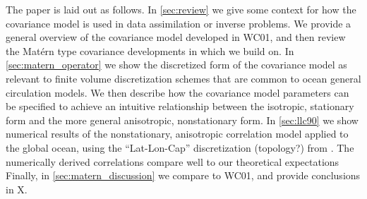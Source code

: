 The paper is laid out as follows.
In \cref{sec:review} we give some context for how the covariance model is
used in data assimilation or inverse problems.
We provide a general overview of the covariance model developed in WC01, and
then review the Mat\'ern type covariance developments in \citet{RSSB:RSSB777}
which we build on.
In \cref{sec:matern_operator} we show the discretized form of the covariance model as
relevant to finite volume discretization schemes that are common to ocean
general circulation models.
We then describe how the covariance model parameters can be specified to achieve
an intuitive relationship between the isotropic, stationary form and the more
general anisotropic, nonstationary form.
In \cref{sec:llc90} we show numerical results of the nonstationary, anisotropic
correlation model applied to the global ocean, using the ``Lat-Lon-Cap''
discretization (topology?) from \citet{forgetECCOv4}.
The numerically derived correlations compare well to our theoretical
expectations
Finally, in \cref{sec:matern_discussion} we compare to WC01, and provide
conclusions in X.
